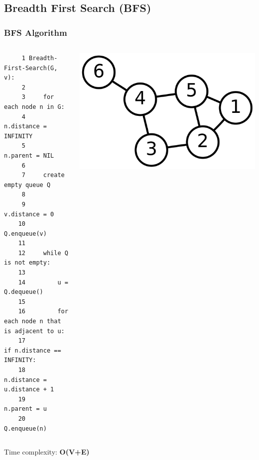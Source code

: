 \documentclass[article]{beamer}
\begin{document}
\subsection{Breadth First Search (BFS)}
\begin{frame}[fragile]
	\frametitle{BFS Algorithm}
	\begin{columns}
		{\tiny
		\begin{lstlisting}
	 1 Breadth-First-Search(G, v):
	 2 
	 3     for each node n in G:            
	 4         n.distance = INFINITY        
	 5         n.parent = NIL
	 6 
	 7     create empty queue Q      
	 8 
	 9     v.distance = 0
	10     Q.enqueue(v)                      
	11 
	12     while Q is not empty:        
	13     
	14         u = Q.dequeue()
	15     
	16         for each node n that is adjacent to u:
	17             if n.distance == INFINITY:
	18                 n.distance = u.distance + 1
	19                 n.parent = u
	20                 Q.enqueue(n)
		\end{lstlisting}
		}
			\includegraphics[scale=0.07]{./figures/graph_dfs_bfs.png}
	\end{columns}
	
	\begin{flushright} 
	Time complexity: \textbf{O(V+E)}
	\end{flushright}
\end{frame}
\end{document}
